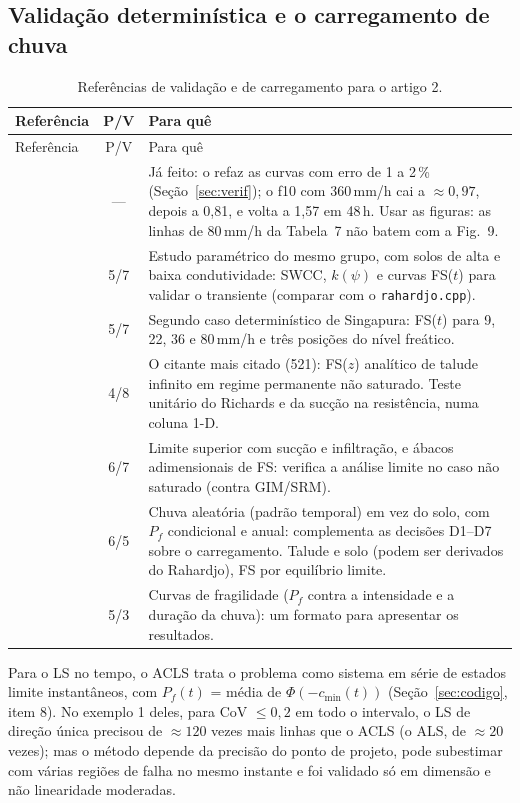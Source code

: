 \documentclass[11pt,a4paper]{article}
\begin{document}
\subsection{Validação determinística e o carregamento de chuva}
{\small\setlength{\tabcolsep}{4pt}
\begin{longtable}{L{3.3cm}cL{11.6cm}}
\caption{Referências de validação e de carregamento para o artigo 2.}\label{tab:chuvaval}\\
\toprule
Referência & P/V & Para quê \\
\midrule\endfirsthead
\toprule Referência & P/V & Para quê \\ \midrule\endhead
\bottomrule\endlastfoot
\citet{rahardjo2007} & --- & Já feito: o  refaz as curvas com erro de 1 a 2\,\%
  (Seção~\ref{sec:verif}); o f10 com 360\,mm/h cai a $\approx 0{,}97$, depois a 0,81, e volta a 1,57 em 48\,h. Usar as
  figuras: as linhas de 80\,mm/h da Tabela~7 não batem com a Fig.~9. \\
\citet{rahimi2010} & 5/7 & Estudo paramétrico do mesmo grupo, com solos de alta e baixa condutividade: SWCC, $k(\psi)$ e
  curvas FS($t$) para validar o transiente (comparar com o \texttt{rahardjo.cpp}). \\
\citet{rahardjo2010} & 5/7 & Segundo caso determinístico de Singapura: FS($t$) para 9, 22, 36 e 80\,mm/h e três
  posições do nível freático. \\
\citet{lugodt2008} & 4/8 & O citante mais citado (521): FS($z$) analítico de talude infinito em regime permanente não
  saturado. Teste unitário do Richards e da sucção na resistência, numa coluna 1-D. \\
\citet{huang2018} & 6/7 & Limite superior com sucção e infiltração, e ábacos adimensionais de FS: verifica a análise
  limite no caso não saturado (contra GIM/SRM). \\
\citet{tang2018} & 6/5 & Chuva aleatória (padrão temporal) em vez do solo, com $P_f$ condicional e anual: complementa as
  decisões D1--D7 sobre o carregamento. Talude e solo (podem ser derivados do Rahardjo), FS por equilíbrio limite. \\
\citet{hu2024} & 5/3 & Curvas de fragilidade ($P_f$ contra a intensidade e a duração da chuva): um formato para
  apresentar os resultados. \\
\end{longtable}}
Para o LS no tempo, o ACLS \citep{yuan2024} trata o problema como sistema em série de estados limite instantâneos, com
$P_f(t)$ = média de $\Phi(-c_\text{min}(t))$ (Seção~\ref{sec:codigo}, item 8). No exemplo 1 deles, para CoV
$\le 0{,}2$ em todo o intervalo, o LS de direção única precisou de $\approx 120$ vezes mais linhas que o ACLS (o ALS, de
$\approx 20$ vezes); mas o método depende da precisão do ponto de projeto, pode subestimar com várias regiões de falha
no mesmo instante e foi validado só em dimensão e não linearidade moderadas.
\end{document}
